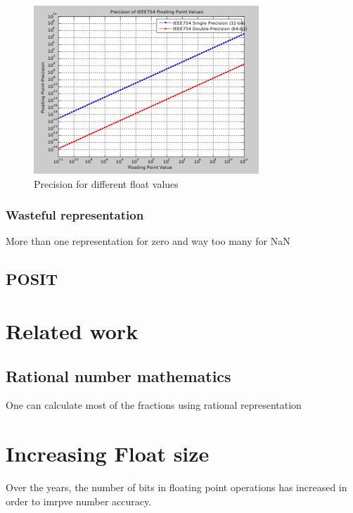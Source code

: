 \documentclass[10pt]{article}
\begin{document}
\begin{figure}[h]
  \centering
  \includegraphics{320px-IEEE754}
  \caption{Precision for different float values}
  \label{prec_value}
\end{figure}

\subsubsection{Wasteful representation}\label{sec:wast-repr}

More than one representation for zero and way too many for NaN

\subsection{POSIT}\label{sec:posit}


\section{Related work}\label{sec:relatedwork}

\subsection{Rational number mathematics}\label{sec:rationalnumbers}

One can calculate most of the fractions using rational representation

\section{Increasing Float size}\label{sec:increasefloat}

Over the years, the number of bits in floating point operations has
increased in order to imrpve number accuracy.
\end{document}
